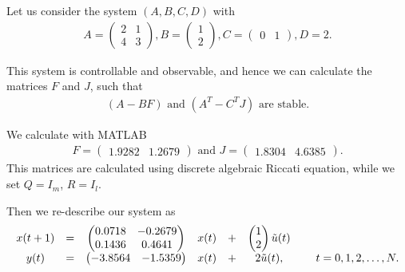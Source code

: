 \begin{example}
	\label{ex:ILC:LQR}
Let us consider the system $(A,B,C,D)$ with 
\begin{align}
\label{eq:ILC:Sys_ex1_origin}
A = \begin{pmatrix}
2 & 1 \\  4 & 3
\end{pmatrix}, B = \begin{pmatrix}
1 \\ 2
\end{pmatrix}, C = \begin{pmatrix}
0 & 1
\end{pmatrix}, D = 2.
\end{align}

This system is controllable and observable, and hence we can calculate the matrices $F$ and $J$, such that 
\begin{align}
(A - BF) \text{ and } (A^T - C^T J) \text{ are stable}. 
\end{align}

We calculate with MATLAB 
\begin{align}
F =\begin{pmatrix}
 1.9282   & 1.2679
\end{pmatrix} \text{ and } 
J = \begin{pmatrix}
1.8304  &  4.6385
\end{pmatrix}. 
\end{align}
This matrices are calculated using discrete algebraic Riccati equation, while we set $Q = I_m$, $R = I_l$. 

Then we re-describe our system as
\begin{align}
\label{eq:ILC:Sys_ex1}
\begin{array}{c c c c c c c c c}
x(t+1) &=&
\begin{pmatrix}
0.0718  & -0.2679\\
0.1436  &  0.4641
\end{pmatrix}
& x(t) &+& 
\begin{pmatrix}
1 \\ 2
\end{pmatrix}
\tilde{u}(t)& &
\\ 
y(t)   &=& \begin{pmatrix}
	-3.8564 &   -1.5359
\end{pmatrix}
& x(t)& +&
 2 \tilde{u} (t),& &\; t = 0, 1, 2, \dots, N. 
\end{array}
\end{align} 





\end{example}
